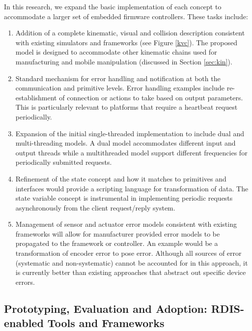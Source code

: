 In this research, we expand the basic implementation of each concept to accommodate a larger set of embedded firmware controllers.  These tasks include: 
\begin{enumerate}
\item Addition of a complete kinematic, visual and collision description consistent with existing simulators and frameworks (see Figure \ref{kvc}).  The proposed model is designed to accommodate other kinematic chains used for manufacturing and mobile manipulation (discussed in Section \ref{sec:kin}). 
\item Standard mechanism for error handling and notification at both the communication and primitive levels.  Error handling examples include re-establishment of connection or actions to take based on output parameters.  This is particularly relevant to platforms that require a heartbeat request periodically.
\item Expansion of the initial single-threaded implementation to include dual and multi-threading models.  A dual model accommodates different input and output threads while a multithreaded model support different frequencies for periodically submitted requests. 
\item Refinement of the state concept and how it matches to primitives and interfaces would provide a scripting language for transformation of data.  The state variable concept is instrumental in implementing periodic requests asynchronously from the client request/reply system.
\item Management of sensor and actuator error models consistent with existing frameworks will allow for manufacturer provided error models to be propagated to the framework or controller.  An example would be a transformation of encoder error to pose error.  Although all sources of error (systematic and non-systematic) cannot be accounted for in this approach, it is currently better than existing approaches that abstract out specific device errors.
\end{enumerate}



\subsection{Prototyping, Evaluation and Adoption: RDIS-enabled Tools and Frameworks}

